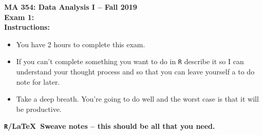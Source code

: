 \documentclass{article}
\begin{document}

\noindent \textbf{MA 354: Data Analysis I -- Fall 2019}\\%
\noindent \textbf{Exam 1:}\vspace{1em}\\
\textbf{Instructions:}
\begin{itemize}
	\item You have 2 hours to complete this exam.
	\item If you can't complete something you want to do in \texttt{R} describe it so I can understand
	your thought process and so that you can leave yourself a to do note for later.
	\item Take a deep breath. You're going to do well and the worst case is that it will be productive.
\end{itemize}
\textbf{\texttt{R}/\LaTeX ~Sweave notes -- this should be all that you need.}
\end{document}

